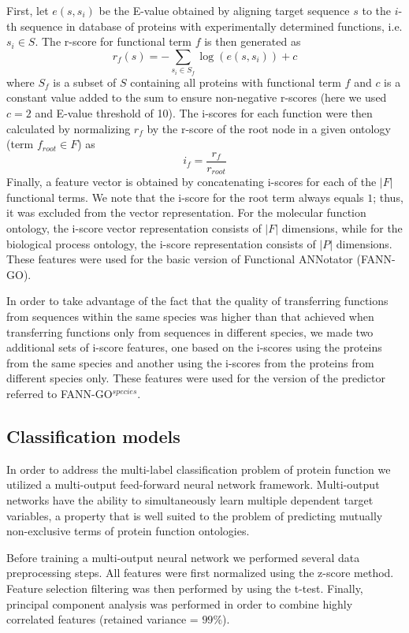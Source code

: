 First, let $e(s, s_{i})$ be the E-value obtained by aligning target sequence $s$ to the $i$-th sequence in database of proteins with experimentally determined functions, i.e. $s_{i}\in S$. The r-score for functional term $f$ is then generated as 
\[
r_{f}(s)=-\underset{s_{i}\in S_{f}}{\sum}\log (e(s,s_{i}))+c
\]
where $S_{f}$ is a subset of $S$ containing all proteins with functional term $f$ and $c$ is a constant value added to the sum to ensure non-negative r-scores (here we used $c=2$ and E-value threshold of 10). The i-scores for each function were then calculated by normalizing $r_{f}$ by the r-score of the root node in a given ontology (term $f_{root}\in F$) as
\[
i_{f}=\frac{r_{f}}{r_{root}}
\]
Finally, a feature vector is obtained by concatenating i-scores for each of the $|F|$ functional terms. We note that the i-score for the root term always equals $1$; thus, it was excluded from the vector representation. For the molecular function ontology, the i-score vector representation consists of $|F|$ dimensions, while for the biological process ontology, the i-score representation consists of $|P|$ dimensions. These features were used for the basic version of Functional ANNotator (FANN-GO).

In order to take advantage of the fact that the quality of transferring functions from sequences within the same species was higher than that achieved when transferring functions only from sequences in different species, we made two additional sets of i-score features, one based on the i-scores using the proteins from the same species and another using the i-scores from the proteins from different species only. These features were used for the version of the predictor referred to FANN-GO$^{species}$. 

\subsection{Classification models}

In order to address the multi-label classification problem of protein function we utilized a multi-output feed-forward neural network framework. Multi-output networks have the ability to simultaneously learn multiple dependent target variables, a property that is well suited to the problem of predicting mutually non-exclusive terms of protein function ontologies. 

Before training a multi-output neural network we performed several data preprocessing steps. All features were first normalized using the z-score method. Feature selection filtering was then performed by using the t-test. Finally, principal component analysis was performed in order to combine highly correlated features (retained variance = $99\%$).

